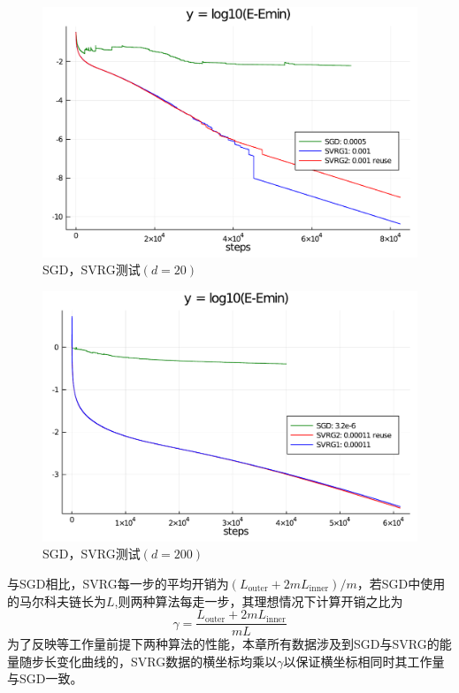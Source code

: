 \begin{figure}[htb]
	\centering
	\includegraphics[width=\textwidth]{image/SVRGexTest3_d=20.pdf}
	\caption{SGD，SVRG测试$(d=20)$}
	\label{fig:sgd-svrg3}
\end{figure}

\begin{figure}[htb]
	\centering
	\includegraphics[width=\textwidth]{image/SVRGexTest1_d=200.pdf}
	\caption{SGD，SVRG测试$(d=200)$}
	\label{fig:sgd-svrg3-2}
\end{figure}

与SGD相比，SVRG每一步的平均开销为$(L_\text{outer}+2mL_\text{inner})/{m}$，若SGD中使用的马尔科夫链长为$L$,则两种算法每走一步，其理想情况下计算开销之比为
\begin{equation}
\gamma = \frac{L_\text{outer}+2mL_\text{inner}}{mL}
\end{equation}
为了反映等工作量前提下两种算法的性能，本章所有数据涉及到SGD与SVRG的能量随步长变化曲线的，SVRG数据的横坐标均乘以$\gamma$以保证横坐标相同时其工作量与SGD一致。

